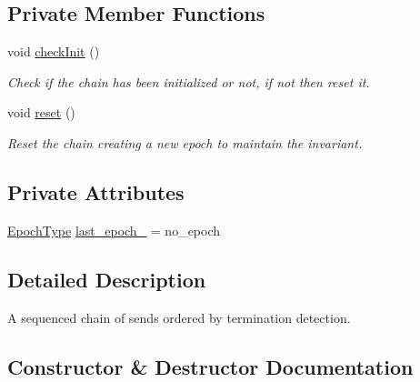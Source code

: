 \subsection*{Private Member Functions}
\begin{DoxyCompactItemize}
\item 
void \hyperlink{classvt_1_1messaging_1_1_dependent_send_chain_a2ebf8a8d7c1cc95afe97ea6f717258c7}{check\+Init} ()
\begin{DoxyCompactList}\small\item\em Check if the chain has been initialized or not, if not then reset it. \end{DoxyCompactList}\item 
void \hyperlink{classvt_1_1messaging_1_1_dependent_send_chain_aa5cf0fcb78d89b1491b154c820eb9ec6}{reset} ()
\begin{DoxyCompactList}\small\item\em Reset the chain creating a new epoch to maintain the invariant. \end{DoxyCompactList}\end{DoxyCompactItemize}
\subsection*{Private Attributes}
\begin{DoxyCompactItemize}
\item 
\hyperlink{namespacevt_a985a5adf291c34a3ca263b3378388236}{Epoch\+Type} \hyperlink{classvt_1_1messaging_1_1_dependent_send_chain_acbba3599015aff00654f3cb8efaba623}{last\+\_\+epoch\+\_\+} = no\+\_\+epoch
\end{DoxyCompactItemize}


\subsection{Detailed Description}
A sequenced chain of sends ordered by termination detection. 

\subsection{Constructor \& Destructor Documentation}
\mbox{\label{classvt_1_1messaging_1_1_dependent_send_chain_a2ac6403b270d59f3619698010688f2b9}} 
